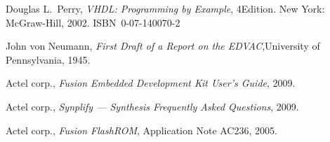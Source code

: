 \documentclass[12pt,a4paper]{article} %
\begin{document}
	
	\clearpage
	\raggedright
	\begin{thebibliography}{9}
			Douglas L.~Perry,
			\textit{VHDL: Programming by Example}, 4\nth Edition. \linebreak[2]
			New York: McGraw-Hill, 2002. ISBN~0-07-140070-2
		
			John von Neumann,
			\textit{First Draft of a Report on the EDVAC},\linebreak[2]
			University of Pennsylvania, 1945.
		
			Actel corp.,
			\textit{Fusion Embedded Development Kit User's Guide}, %
			2009.
		
			Actel corp.,
			\textit{Synplify — Synthesis Frequently Asked Questions}, %
			2009.
		
			Actel corp.,
			\textit{Fusion FlashROM}, Application Note AC236, %
			2005.
		
		
	\end{thebibliography}
	
\end{document}
